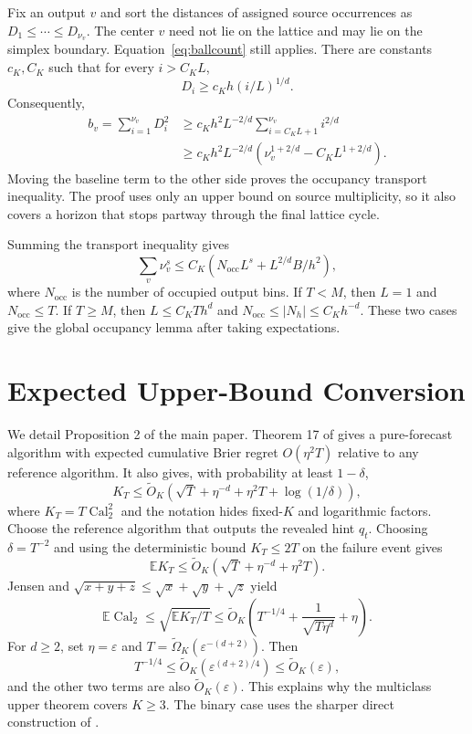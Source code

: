 \documentclass[twoside]{article}
\newcommand{\E}{\mathbb E}
\newcommand{\caltwo}{\operatorname{Cal}_2}
\newcommand{\1}{\mathbf 1}
\begin{document}
Fix an output $v$ and sort the distances of assigned source occurrences as
$D_1\leq\cdots\leq D_{\nu_v}$. The center $v$ need not lie on the lattice and
may lie on the simplex boundary. Equation~\eqref{eq:ballcount} still applies.
There are constants $c_K,C_K$ such that for every $i>C_KL$,
\[
 D_i\geq c_Kh(i/L)^{1/d}.
\]
Consequently,
\begin{align*}
 b_v=\sum_{i=1}^{\nu_v}D_i^2
 &\geq c_Kh^2L^{-2/d}
 \sum_{i=C_KL+1}^{\nu_v}i^{2/d}\\
 &\geq c_Kh^2L^{-2/d}
 \left(\nu_v^{1+2/d}-C_KL^{1+2/d}\right).
\end{align*}
Moving the baseline term to the other side proves the occupancy transport
inequality. The proof uses only an upper bound on source multiplicity, so it
also covers a horizon that stops partway through the final lattice cycle.

Summing the transport inequality gives
\[
 \sum_v\nu_v^s
 \leq C_K\left(
 N_{\mathrm{occ}}L^s+L^{2/d}B/h^2\right),
\]
where $N_{\mathrm{occ}}$ is the number of occupied output bins. If $T<M$, then
$L=1$ and $N_{\mathrm{occ}}\leq T$. If $T\geq M$, then
$L\leq C_KTh^d$ and $N_{\mathrm{occ}}\leq|N_h|\leq C_Kh^{-d}$. These two cases
give the global occupancy lemma after taking expectations.

\section{Expected Upper-Bound Conversion}

We detail Proposition 2 of the main paper. Theorem 17 of
\citet{chen2026calibeating} gives a pure-forecast algorithm with expected
cumulative Brier regret $O(\eta^2T)$ relative to any reference algorithm. It
also gives, with probability at least $1-\delta$,
\[
 K_T\leq\widetilde O_K\left(
 \sqrt T+\eta^{-d}+\eta^2T+\log(1/\delta)
 \right),
\]
where $K_T=T\caltwo^2$ and the notation hides fixed-$K$ and logarithmic
factors. Choose the reference algorithm that outputs the revealed hint $q_t$.
Choosing $\delta=T^{-2}$ and using the deterministic bound $K_T\leq2T$ on the
failure event gives
\[
 \E K_T\leq\widetilde O_K(\sqrt T+\eta^{-d}+\eta^2T).
\]
Jensen and $\sqrt{x+y+z}\leq\sqrt x+\sqrt y+\sqrt z$ yield
\[
 \E\caltwo
 \leq\sqrt{\E K_T/T}
 \leq\widetilde O_K\left(
 T^{-1/4}+\frac1{\sqrt{T\eta^d}}+\eta\right).
\]
For $d\geq2$, set $\eta=\varepsilon$ and
$T=\widetilde\Omega_K(\varepsilon^{-(d+2)})$. Then
\[
 T^{-1/4}\leq\widetilde O_K(\varepsilon^{(d+2)/4})
 \leq\widetilde O_K(\varepsilon),
\]
and the other two terms are also $\widetilde O_K(\varepsilon)$. This explains
why the multiclass upper theorem covers $K\geq3$. The binary case uses the
sharper direct construction of \citet{hu2026optimal}.
\end{document}
